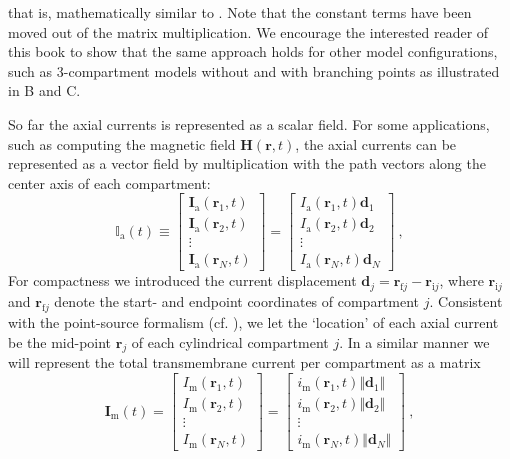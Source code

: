%
that is, mathematically similar to . 
Note that the constant terms have been moved out of the matrix multiplication.
We encourage the interested reader of this book to show that the same approach holds for other model configurations, such
as 3-compartment models without and with branching points as illustrated in B and C.

So far\sntxt{,} the axial currents is represented as a scalar field.
For some applications, such as computing the magnetic field $\mathbf{H}(\mathbf{r}, t)$,
the axial currents can be represented as a vector field by multiplication with the path vectors along the center axis of each compartment:
%
\begin{equation}
\mathbb{I}_\text{a}(t) \equiv
\begin{bmatrix}
\mathbf{I}_\text{a}(\mathbf{r}_1, t)\\
\mathbf{I}_\text{a}(\mathbf{r}_2, t)\\
\vdots \\
\mathbf{I}_\text{a}(\mathbf{r}_N, t)
\end{bmatrix}
=
\begin{bmatrix}
I_\text{a}(\mathbf{r}_1, t) \mathbf{d}_1 \\
I_\text{a}(\mathbf{r}_2, t) \mathbf{d}_2 \\
\vdots \\
I_\text{a}(\mathbf{r}_N, t) \mathbf{d}_N
\end{bmatrix} ~,
\end{equation}
%
For compactness\sntxt{,} we introduced the current displacement $\mathbf{d}_j=\mathbf{r}_{\text{f}j} - \mathbf{r}_{\text{i}j}$,
where $\mathbf{r}_{\text{i}j}$ and $\mathbf{r}_{\text{f}j}$ denote the start- and endpoint coordinates of compartment $j$.
Consistent with the point-source formalism (cf. ),
we let the `location' of each axial current be the mid-point $\mathbf{r}_j$ of each cylindrical compartment $j$.
In a similar manner we will represent the total transmembrane current per compartment as a matrix
\begin{equation}
\mathbf{I}_\text{m}(t) =
\begin{bmatrix}
I_\text{m}(\mathbf{r}_1, t) \\
I_\text{m}(\mathbf{r}_2, t) \\
\vdots \\
I_\text{m}(\mathbf{r}_N, t)
\end{bmatrix}
=
\begin{bmatrix}
i_\text{m}(\mathbf{r}_1, t) \Vert \mathbf{d}_1 \Vert \\
i_\text{m}(\mathbf{r}_2, t) \Vert \mathbf{d}_2 \Vert \\
\vdots \\
i_\text{m}(\mathbf{r}_N, t) \Vert \mathbf{d}_N \Vert
\end{bmatrix} ~,
\end{equation}
